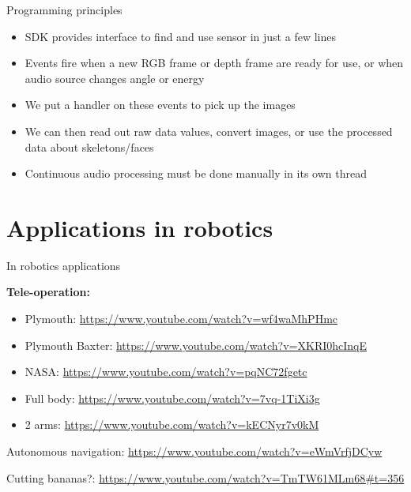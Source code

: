 \documentclass[compress]{beamer}
\begin{document}
\begin{frame}{Programming principles}

    \begin{itemize}

        \item
              SDK provides interface to find and use sensor in just a few lines
        \item
              Events fire when a new RGB frame or depth frame are ready for use, or
              when audio source changes angle or energy
        \item
              We put a handler on these events to pick up the images
        \item
              We can then read out raw data values, convert images, or use the
              processed data about skeletons/faces
        \item
              Continuous audio processing must be done manually in its own thread
    \end{itemize}

\end{frame}

\section{Applications in robotics}

\begin{frame}{In robotics applications}

    \textbf{Tele-operation:}

    \begin{itemize}

        \item
              Plymouth: \url{https://www.youtube.com/watch?v=wf4waMhPHmc}
        \item
              Plymouth Baxter: \url{https://www.youtube.com/watch?v=XKRI0hcInqE}
        \item
              NASA: \url{https://www.youtube.com/watch?v=pqNC72fgetc}
        \item
              Full body: \url{https://www.youtube.com/watch?v=7vq-1TiXi3g}
        \item
              2 arms: \url{https://www.youtube.com/watch?v=kECNyr7v0kM}
    \end{itemize}

    Autonomous navigation: \url{https://www.youtube.com/watch?v=eWmVrfjDCyw}

    Cutting bananas?:
    \url{https://www.youtube.com/watch?v=TmTW61MLm68\#t=356}

\end{frame}
\end{document}
